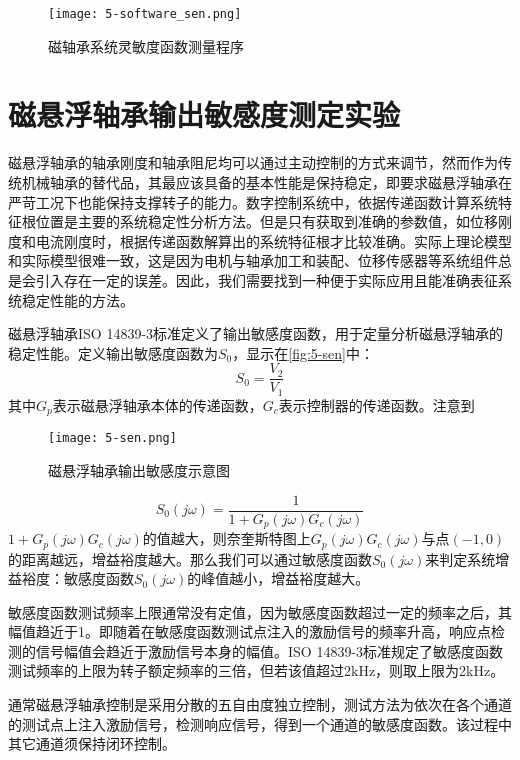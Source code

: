 \begin{figure}
	\texttt{[image: 5-software\_sen.png]}
	\caption{磁轴承系统灵敏度函数测量程序}
	\label{fig:5-software_sen}
\end{figure}

\section{磁悬浮轴承输出敏感度测定实验}
磁悬浮轴承的轴承刚度和轴承阻尼均可以通过主动控制的方式来调节，然而作为传统机械轴承的替代品，其最应该具备的基本性能是保持稳定，即要求磁悬浮轴承在严苛工况下也能保持支撑转子的能力。数字控制系统中，依据传递函数计算系统特征根位置是主要的系统稳定性分析方法。但是只有获取到准确的参数值，如位移刚度和电流刚度时，根据传递函数解算出的系统特征根才比较准确。实际上理论模型和实际模型很难一致，这是因为电机与轴承加工和装配、位移传感器等系统组件总是会引入存在一定的误差。因此，我们需要找到一种便于实际应用且能准确表征系统稳定性能的方法。

磁悬浮轴承ISO 14839-3标准\cite{iso2004mechanical}定义了输出敏感度函数，用于定量分析磁悬浮轴承的稳定性能。定义输出敏感度函数为$S_0$，显示在\autoref{fig:5-sen}中：
\begin{equation}
	S_0 = \frac{V_2}{V_1}
\end{equation}
其中$G_p$表示磁悬浮轴承本体的传递函数，$G_c$表示控制器的传递函数。注意到
\begin{figure}
	\texttt{[image: 5-sen.png]}
	\caption{磁悬浮轴承输出敏感度示意图}
	\label{fig:5-sen}
\end{figure}

\begin{equation}
	S_0(j\omega) = \frac{1}{1 + G_p(j\omega)G_c(j\omega)}
\end{equation}
$1 + G_p(j\omega)G_c(j\omega)$的值越大，则奈奎斯特图上$G_p(j\omega)G_c(j\omega)$与点$(-1,0)$的距离越远，增益裕度越大。那么我们可以通过敏感度函数$S_0(j\omega)$来判定系统增益裕度：敏感度函数$S_0(j\omega)$的峰值越小，增益裕度越大。

敏感度函数测试频率上限通常没有定值，因为敏感度函数超过一定的频率之后，其幅值趋近于1。即随着在敏感度函数测试点注入的激励信号的频率升高，响应点检测的信号幅值会趋近于激励信号本身的幅值。ISO 14839-3标准规定了敏感度函数测试频率的上限为转子额定频率的三倍，但若该值超过2kHz，则取上限为2kHz。

通常磁悬浮轴承控制是采用分散的五自由度独立控制，测试方法为依次在各个通道的测试点上注入激励信号，检测响应信号，得到一个通道的敏感度函数。该过程中其它通道须保持闭环控制。

